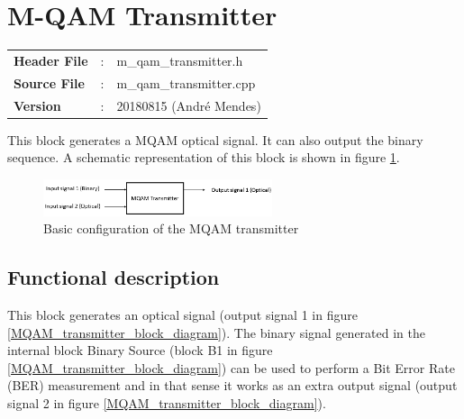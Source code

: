 \clearpage

\section{M-QAM Transmitter}

\begin{tcolorbox}	
	\begin{tabular}{p{2.75cm} p{0.2cm} p{10.5cm}} 	
		\textbf{Header File}   &:& m\_qam\_transmitter.h \\
		\textbf{Source File}   &:& m\_qam\_transmitter.cpp \\
        \textbf{Version}       &:& 20180815 (Andr\'e Mendes)\\
	\end{tabular}
\end{tcolorbox}

This block generates a MQAM optical signal. It can also output the binary sequence. A schematic representation of this block is shown in figure \ref{MQAM_transmitter_block_diagram_simple}.

\begin{figure}[h]
	\centering
	\includegraphics[width=0.6\textwidth]{./lib/m_qam_transmitter/figures/MQAM_transmitter_block_diagram_simple}
	\caption{Basic configuration of the MQAM transmitter}\label{MQAM_transmitter_block_diagram_simple}
\end{figure}

\subsection*{Functional description}

This block generates an optical signal (output signal 1 in figure \ref{MQAM_transmitter_block_diagram}). The binary signal generated in the internal block Binary Source (block B1 in figure \ref{MQAM_transmitter_block_diagram}) can be used to perform a Bit Error Rate (BER) measurement and in that sense it works as an extra output signal (output signal 2 in figure \ref{MQAM_transmitter_block_diagram}).

